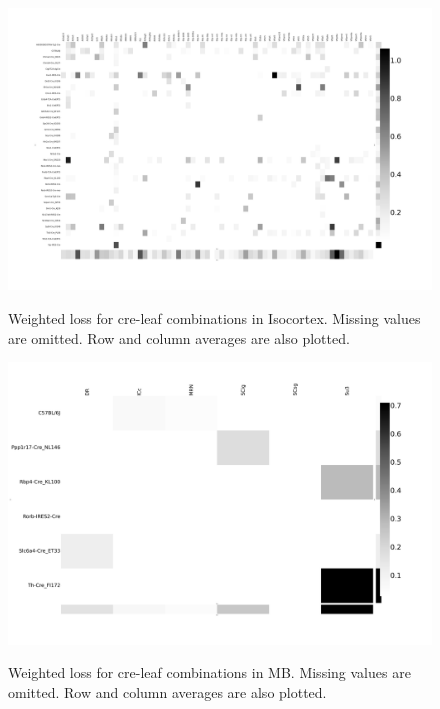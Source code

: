 \begin{figure}[H]
    \centering
    \includegraphics[width = 7in]{figs/lossdetails_315.png} 
    \label{fig:distances}
    \caption{Weighted loss for cre-leaf combinations in Isocortex. Missing values are omitted.  Row and column averages are also plotted.}
\end{figure}

\begin{figure}[H]
    \centering
    \includegraphics[width = 7in]{figs/lossdetails_313.png} 
    \label{fig:distances}
    \caption{Weighted loss for cre-leaf combinations in MB. Missing values are omitted.   Row and column averages are also plotted.}
\end{figure}

